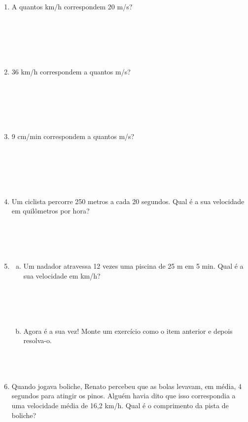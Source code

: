 \documentclass[a4paper,14pt]{article}
\begin{document}
    \begin{multicols}{2}
    	\begin{enumerate}
    		\item A quantos km/h correspondem 20 m/s? \\\\\\\\\\\\
    		\item 36 km/h correspondem a quantos m/s? \\\\\\\\\\\\
    		\item 9 cm/min correspondem a quantos m/s? \\\\\\\\\\\\
    		\item Um ciclista percorre 250 metros a cada 20 segundos. Qual é a sua velocidade em quilômetros por hora? \\\\\\\\\\
    		\item 
    		\begin{enumerate}[a)]
    			\item Um nadador atravessa 12 vezes uma piscina de 25 m em 5 min. Qual é a sua velocidade em km/h? \\\\\\\\\\
    			\item Agora é a sua vez! Monte um exercício como o item anterior e depois resolva-o. \\\\\\\\
    		\end{enumerate}
    	    \item Quando jogava boliche, Renato percebeu que as bolas levavam, em média, 4 segundos para atingir os pinos. Alguém havia dito que isso correspondia a uma velocidade média de 16,2 km/h. Qual é o comprimento da pista de boliche? \\\\\\\\\\\\\\\\\\\\

\end{enumerate}
\end{multicols}
\end{document}
